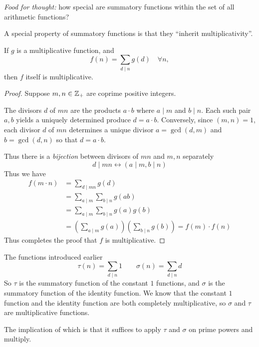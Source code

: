\emph{Food for thought:} how special are summatory functions within the set of all arithmetic functions?

A special property of summatory functions is that they ``inherit multiplicativity''.
\begin{lemma}
    If $g$ is a multiplicative function, and \[f(n) = \sum_{d\mid n}g(d)\quad \forall n,\] then $f$ itself is multiplicative.
\end{lemma}

\begin{proof}
    Suppose $m, n\in \mathbb Z_+$ are coprime positive integers.

    The divisors $d$ of $mn$ are the products $a\cdot b$ where $a\mid m$ and $b\mid n$. Each such pair $a, b$ yields a uniquely determined produce $d = a\cdot b$. Conversely, since $(m, n) = 1$, each divisor $d$ of $mn$ determines a unique divisor $a=\gcd(d, m)$ and $b = \gcd(d, n)$ so that $d = a\cdot b$.

    Thus there is a \emph{bijection} between divisors of $mn$ and $m, n$ separately
    \[d\mid mn \longleftrightarrow (a\mid m, b\mid n)\]
    Thus we have
    \begin{align*}
        f(m\cdot n) & = \sum_{d\mid mn}g(d)                                              \\
                    & = \sum_{a\mid m}\sum_{b\mid n}g(ab)                                \\
                    & = \sum_{a\mid m}\sum_{b\mid n}g(a)g(b)                             \\
                    & = \left(\sum_{a\mid m} g(a)\right) \left(\sum_{b\mid n}g(b)\right)
        = f(m)\cdot f(n)
    \end{align*}
    Thus completes the proof that $f$ is multiplicative.
\end{proof}

\recall The functions introduced earlier
\[\tau(n) = \sum_{d\mid n} 1\qquad \sigma(n) = \sum_{d\mid n}d\]
So $\tau$ is the summatory function of the constant $1$ functions, and $\sigma$ is the summatory function of the identity function. We know that the constant $1$ function and the identity function are both completely multiplicative, so $\sigma$ and $\tau$ are multiplicative functions.

The implication of which is that it suffices to apply $\tau$ and $\sigma$ on prime powers and multiply.

